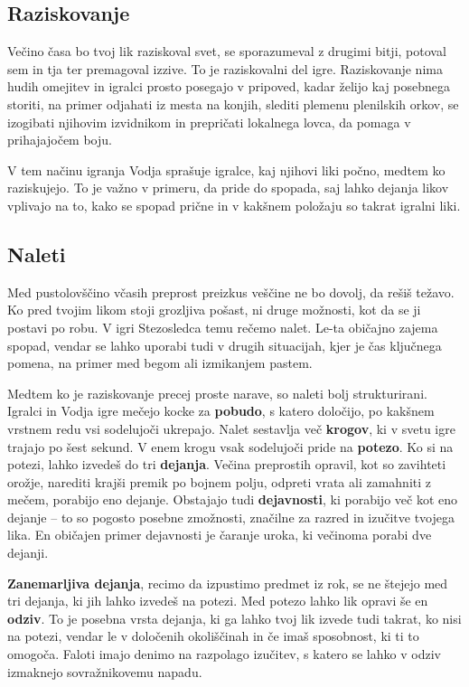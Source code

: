 \subsection{Raziskovanje}
Večino časa bo tvoj lik raziskoval svet, se sporazumeval z drugimi bitji, potoval sem in tja ter premagoval izzive. To je raziskovalni del igre. Raziskovanje nima hudih omejitev in igralci prosto posegajo v pripoved, kadar želijo kaj posebnega storiti, na primer odjahati iz mesta na konjih, slediti plemenu plenilskih orkov, se izogibati njihovim izvidnikom in prepričati lokalnega lovca, da pomaga v prihajajočem boju.

V tem načinu igranja Vodja sprašuje igralce, kaj njihovi liki počno, medtem ko raziskujejo. To je važno v primeru, da pride do spopada, saj lahko dejanja likov vplivajo na to, kako se spopad prične in v kakšnem položaju so takrat igralni liki.

\subsection{Naleti}
Med pustolovščino včasih preprost preizkus veščine ne bo dovolj, da rešiš težavo. Ko pred tvojim likom stoji grozljiva pošast, ni druge možnosti, kot da se ji postavi po robu. V igri Stezosledca temu rečemo nalet. Le-ta običajno zajema spopad, vendar se lahko uporabi tudi v drugih situacijah, kjer je čas ključnega pomena, na primer med begom ali izmikanjem pastem.

Medtem ko je raziskovanje precej proste narave, so naleti bolj strukturirani. Igralci in Vodja igre mečejo kocke za \textbf{pobudo}, s katero določijo, po kakšnem vrstnem redu vsi sodelujoči ukrepajo. Nalet sestavlja več \textbf{krogov}, ki v svetu igre trajajo po šest sekund. V enem krogu vsak sodelujoči pride na \textbf{potezo}. Ko si na potezi, lahko izvedeš do tri \textbf{dejanja}. Večina preprostih opravil, kot so zavihteti orožje, narediti krajši premik po bojnem polju, odpreti vrata ali zamahniti z mečem, porabijo eno dejanje. Obstajajo tudi \textbf{dejavnosti}, ki porabijo več kot eno dejanje -- to so pogosto posebne zmožnosti, značilne za razred in izučitve tvojega lika. En običajen primer dejavnosti je čaranje uroka, ki večinoma porabi dve dejanji.

\textbf{Zanemarljiva dejanja}, recimo da izpustimo predmet iz rok, se ne štejejo med tri dejanja, ki jih lahko izvedeš na potezi. Med potezo lahko lik opravi še en \textbf{odziv}. To je posebna vrsta dejanja, ki ga lahko tvoj lik izvede tudi takrat, ko nisi na potezi, vendar le v določenih okoliščinah in če imaš sposobnost, ki ti to omogoča. Faloti imajo denimo na razpolago izučitev, s katero se lahko v odziv izmaknejo sovražnikovemu napadu.

